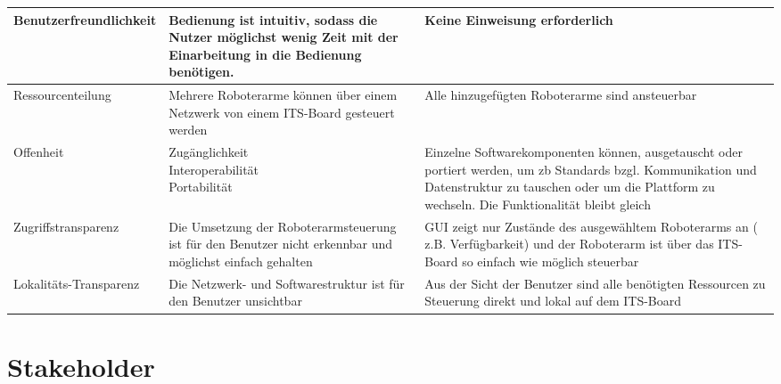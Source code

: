 \begin{longtable}{|>{\raggedright\arraybackslash}p{4cm}|>{\raggedright\arraybackslash}p{5cm}|>{\raggedright\arraybackslash}p{5cm}|}
        \\
        \hline
        Benutzerfreundlichkeit & Bedienung ist intuitiv, sodass die Nutzer möglichst wenig Zeit mit der Einarbeitung in die Bedienung benötigen. 
        & Keine Einweisung erforderlich
        \\
        \hline
        Ressourcenteilung  & Mehrere Roboterarme können über einem Netzwerk von einem ITS-Board gesteuert werden& Alle hinzugefügten Roboterarme sind ansteuerbar \\
        \hline
        Offenheit & 
       	\parbox[t]{5cm}{Zugänglichkeit\\Interoperabilität\\Portabilität} 
        & Einzelne Softwarekomponenten können, ausgetauscht oder portiert werden, um zb Standards bzgl. Kommunikation und Datenstruktur zu tauschen oder um die Plattform zu wechseln. Die Funktionalität bleibt gleich\\
        \hline
        Zugriffstransparenz   & Die Umsetzung der Roboterarmsteuerung ist für den Benutzer nicht erkennbar und möglichst einfach gehalten & GUI zeigt nur Zustände des ausgewähltem Roboterarms an ( z.B. Verfügbarkeit) und der Roboterarm ist über das ITS-Board so einfach wie möglich steuerbar\\
        \hline
        Lokalitäts-Transparenz  & Die Netzwerk- und Softwarestruktur ist für den Benutzer unsichtbar  & Aus der Sicht der Benutzer sind alle benötigten Ressourcen zu Steuerung direkt und lokal auf dem ITS-Board\\
       
        
\end{longtable}



\clearpage
\section{Stakeholder}

